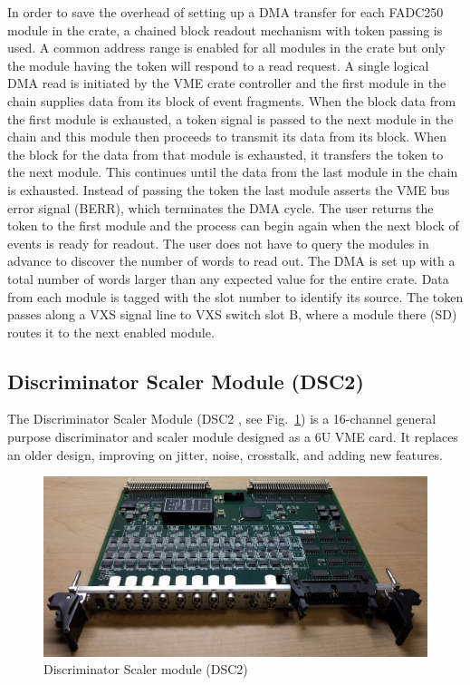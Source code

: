 In order to save the overhead of setting up a DMA transfer for each FADC250 module in the crate, a chained block readout mechanism with token passing is used.  A common address range is enabled for all modules in the crate but only the module having the token will respond to a read request.  A single logical DMA read is initiated by the VME crate controller and the first module in the chain supplies data from its block of event fragments.  When the block data from the first module is exhausted, a token signal is passed to the next module in the chain and this module then proceeds to transmit its data from its block.  When the block for the data from that module is exhausted, it transfers the token to the next module.  This continues until the data from the last module in the chain is exhausted.  Instead of passing the token the last module asserts the VME bus error signal (BERR), which terminates the DMA cycle.  The user returns the token to the first module and the process can begin again when the next block of events is ready for readout.  The user does not have to query the modules in advance to discover the number of words to read out.  The DMA is set up with a total number of words larger than any expected value for the entire crate.  Data from each module is tagged with the slot number to identify its source.  The token passes along a VXS signal line to VXS switch slot B, where a module there (SD) routes it to the next enabled module.


\subsection{Discriminator Scaler Module (DSC2)}

The Discriminator Scaler Module (DSC2 \cite{dsc2-ref}, see Fig.~\ref{fig:dsc2_board}) is a 16-channel general purpose discriminator and scaler module designed as a 6U VME card. It replaces an older design, improving on jitter, noise, crosstalk, and adding new features.

\begin{figure}[hbt]
	\centering
	\includegraphics[width=1.0\columnwidth,keepaspectratio]{img/dsc2_board.png}
	\caption{Discriminator Scaler module (DSC2)}
	\label{fig:dsc2_board}
\end{figure}

